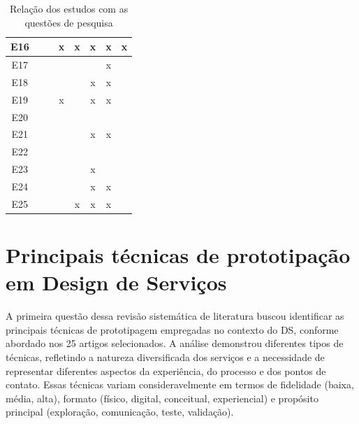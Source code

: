 \begin{table}[h!]
\begin{tabular}{|c|c|c|c|c|c|c|c|}
		E16 & \cite{lee2022how} & \checkmark & x & x & x & x & x\\ \hline
		E17 & \cite{quintero2021interdisciplinary} & \checkmark & \checkmark & \checkmark & \checkmark & x & \checkmark \\ \hline
		E18 & \cite{iriarte2023service} & \checkmark & \checkmark & \checkmark & x & x & \checkmark \\ \hline
		E19 & \cite{leinonen2023service} & \checkmark & x & \checkmark & x & x & \checkmark\\ \hline
		E20 & \cite{mager2023product} & \checkmark & \checkmark & \checkmark & \checkmark & \checkmark & \checkmark\\ \hline
		E21 & \cite{nguyen2022human} & \checkmark & \checkmark & \checkmark & x & x & \checkmark\\ \hline
		E22 & \cite{paust2025integrative} & \checkmark & \checkmark & \checkmark & \checkmark & \checkmark & \checkmark\\ \hline
		E23 & \cite{Vieira2025} & \checkmark & \checkmark & \checkmark & x & \checkmark & \checkmark\\ \hline
		E24 & \cite{schlott2024design} & \checkmark & \checkmark & \checkmark & x & x & \checkmark\\ \hline
		E25 & \cite{you2022applying} & \checkmark & \checkmark & x & x & x & \checkmark \\ \hline

	\end{tabular}
	\caption{Relação dos estudos com as questões de pesquisa}
\end{table}



\section{Principais técnicas de prototipação em Design de Serviços}

A primeira questão dessa revisão sistemática de literatura buscou identificar as principais técnicas de prototipagem empregadas no contexto do DS, conforme abordado nos 25 artigos selecionados. A análise demonstrou diferentes tipos de técnicas, refletindo a natureza diversificada dos serviços e a necessidade de representar diferentes aspectos da experiência, do processo e dos pontos de contato. Essas técnicas variam consideravelmente em termos de fidelidade (baixa, média, alta), formato (físico, digital, conceitual, experiencial) e propósito principal (exploração, comunicação, teste, validação).

